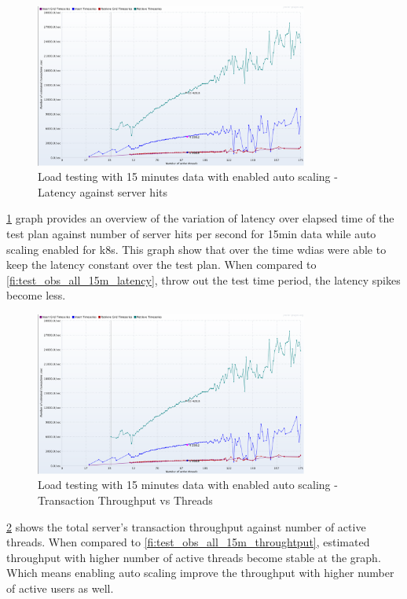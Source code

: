 \begin{figure}[htp]
    \centering
    \includegraphics[width=0.8\textwidth]{results/obs/all_auto/obs_all_auto_15m_transaction_throughtput_vs_threads.png}
    \caption{Load testing with 15 minutes data with enabled auto scaling - Latency against server hits}
    \label{fi:test_obs_all_auto_15m_latency}
\end{figure}
\ref{fi:test_obs_all_auto_15m_latency} graph provides an overview of the variation of latency over elapsed time of the test plan against number of server hits per second for 15min data while auto scaling enabled for \acrshort{k8s}.
This graph show that over the time \acrshort{wdias} were able to keep the latency constant over the test plan.
When compared to \ref{fi:test_obs_all_15m_latency}, throw out the test time period, the latency spikes become less.

\begin{figure}[htp]
    \centering
    \includegraphics[width=0.8\textwidth]{results/obs/all_auto/obs_all_auto_15m_transaction_throughtput_vs_threads.png}
    \caption{Load testing with 15 minutes data with enabled auto scaling - Transaction Throughput vs Threads}
    \label{fi:test_obs_all_auto_15m_throughtput}
\end{figure}
\ref{fi:test_obs_all_auto_15m_throughtput} shows the total server's transaction throughput against number of active threads.
When compared to \ref{fi:test_obs_all_15m_throughtput}, estimated throughput with higher number of active threads become stable at the graph. Which means enabling auto scaling improve the throughput with higher number of active users as well.

